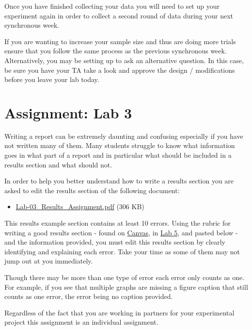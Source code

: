 \documentclass[
]{book}
\providecommand{\tightlist}{%
  \setlength{\itemsep}{0pt}\setlength{\parskip}{0pt}}
\begin{document}
Once you have finished collecting your data you will need to set up your experiment again in order to collect a second round of data during your next synchronous week.

If you are wanting to increase your sample size and thus are doing more trials ensure that you follow the same process as the previous synchronous week. Alternatively, you may be setting up to ask an alternative question. In this case, be sure you have your TA take a look and approve the design / modifications before you leave your lab today.

\hypertarget{assignment-lab-3}{%
\chapter*{Assignment: Lab 3}\label{assignment-lab-3}}

Writing a report can be extremely daunting and confusing especially if you have not written many of them. Many students struggle to know what information goes in what part of a report and in particular what should be included in a results section and what should not.

In order to help you better understand how to write a results section you are asked to edit the results section of the following document:

\begin{itemize}
\tightlist
\item
  \href{files/lab-3_report/Lab-03_Results_Assignment.pdf}{Lab-03\_Results\_Assignment.pdf} (306 KB)
\end{itemize}

This results example section contains at least 10 errors. Using the rubric for writing a good results section - found on \href{https://canvas.ubc.ca}{Canvas}, in \href{05-Lab-5\#rubric.html}{Lab 5}, and pasted below - and the information provided, you must edit this results section by clearly identifying and explaining each error. Take your time as some of them may not jump out at you immediately.

Though there may be more than one type of error each error only counts as one. For example, if you see that multiple graphs are missing a figure caption that still counts as one error, the error being no caption provided.

Regardless of the fact that you are working in partners for your experimental project this assignment is an individual assignment.
\end{document}
